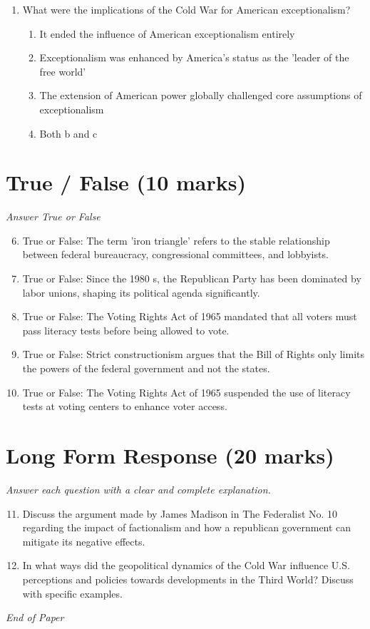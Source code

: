 \documentclass[12pt]{article}
\begin{document}
\begin{enumerate}[label=\arabic*.]
\begin{enumerate}[label=(\alph*)]
    \item All of the above
\end{enumerate}
\item What were the implications of the Cold War for American exceptionalism?
\begin{enumerate}[label=(\alph*)]
    \item It ended the influence of American exceptionalism entirely
    \item Exceptionalism was enhanced by America's status as the 'leader of the free world'
    \item The extension of American power globally challenged core assumptions of exceptionalism
    \item Both b and c
\end{enumerate}
\end{enumerate}

\section*{True / False (10 marks)}
\textit{Answer True or False}
\begin{enumerate}[label=\arabic*.]
\setcounter{enumi}{5}
\item True or False: The term 'iron triangle' refers to the stable relationship between federal bureaucracy, congressional committees, and lobbyists.
\item True or False: Since the 1980 s, the Republican Party has been dominated by labor unions, shaping its political agenda significantly.
\item True or False: The Voting Rights Act of 1965 mandated that all voters must pass literacy tests before being allowed to vote.
\item True or False: Strict constructionism argues that the Bill of Rights only limits the powers of the federal government and not the states.
\item True or False: The Voting Rights Act of 1965 suspended the use of literacy tests at voting centers to enhance voter access.
\end{enumerate}

\section*{Long Form Response (20 marks)}
\textit{Answer each question with a clear and complete explanation.}
\begin{enumerate}[label=\arabic*.]
\setcounter{enumi}{10}
\item Discuss the argument made by James Madison in The Federalist No. 10 regarding the impact of factionalism and how a republican government can mitigate its negative effects.
\item In what ways did the geopolitical dynamics of the Cold War influence U.S. perceptions and policies towards developments in the Third World? Discuss with specific examples.
\end{enumerate}

\vfill
\noindent\textit{End of Paper}
\end{document}
